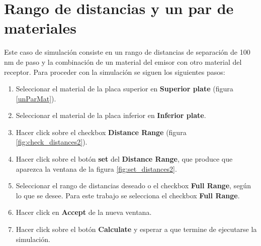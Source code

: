 \section{Rango de distancias y un par de materiales}\label{DrMf}
Este caso de simulación consiste en un rango de distancias de separación de 100 nm de paso y la combinación de un material del emisor con otro material del receptor.
Para proceder con la simulación se siguen los siguientes pasos:
	\begin{enumerate}
		\item Seleccionar el material de la placa superior en \textbf{Superior plate} (figura \ref{unParMat}).
		\item Seleccionar el material de la placa inferior en \textbf{Inferior plate}.
		\item Hacer click sobre el checkbox \textbf{Distance Range} (figura \ref{fig:check_distances2}).
		\item Hacer click sobre el botón \textbf{set} del \textbf{Distance Range}, que produce que aparezca la ventana de la figura \ref{fig:set_distances2}.
		\item Seleccionar el rango de distancias deseado o el checkbox \textbf{Full Range}, según lo que se desee. Para este trabajo se selecciona el checkbox \textbf{Full Range}.
		\item Hacer click en \textbf{Accept} de la nueva ventana.
		\item Hacer click sobre el botón \textbf{Calculate} y esperar a que termine de ejecutarse la simulación.
	\end{enumerate}

